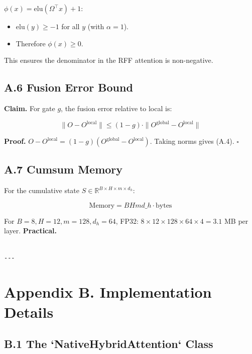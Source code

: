 $\phi(x) = \mathrm{elu}(\Omega^\top x) + 1$:

\begin{itemize}
\item $\mathrm{elu}(y) \geq -1$ for all $y$ (with $\alpha = 1$).
\item Therefore $\phi(x) \geq 0$.

\end{itemize}
This ensures the denominator in the RFF attention is non-negative.

\subsection{A.6 Fusion Error Bound}

\textbf{Claim.} For gate $g$, the fusion error relative to local is:

\[
\|O - O^\text{local}\| \leq (1 - g) \cdot \|O^\text{global} - O^\text{local}\|
\tag{A.4}
\]

\textbf{Proof.} $O - O^\text{local} = (1 - g)(O^\text{global} - O^\text{local})$. 
Taking norms gives (A.4). $\square$

\subsection{A.7 Cumsum Memory}

For the cumulative state $S \in \mathbb{R}^{B \times H \times m \times d_h}$:

\[
\text{Memory} = B H m d\_h \cdot \text{bytes}
\tag{A.5}
\]

For $B=8, H=12, m=128, d_h=64$, FP32: $8 \times 12 \times 128 \times 64 \times 4 = 3.1$ MB per layer. \textbf{Practical.}
\begin{lstlisting}

---
\end{lstlisting}


\section{Appendix B. Implementation Details}

\subsection{B.1 The `NativeHybridAttention` Class}

